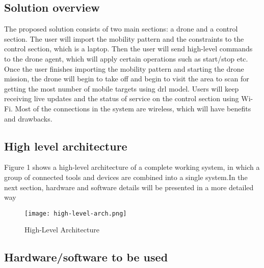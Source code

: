\documentclass[../main.tex]{subfiles}
\begin{document}
\subsection{Solution overview}

The proposed solution consists of two main sections: a drone and a control section. The user will import
the mobility pattern and the constraints to the control section, which is a laptop. Then the user will send high-level commands to the drone agent, which will apply certain operations such as start/stop etc. Once the user finishes importing the mobility pattern and starting the drone mission, the drone will begin to take off and begin to visit the area to scan for getting the most number of mobile targets using \gls{drl} model. Users will keep receiving live updates and the status of service on the control section using Wi-Fi. Most of the connections in the system are wireless, which will have benefits and drawbacks.


\subsection{High level architecture}
Figure 1 shows a high-level architecture of a complete working system, in which a group of connected tools and devices are combined into a single system.In the next section, hardware and software details will be presented in a more detailed way
\begin{figure}[H]
	\centering
	\texttt{[image: high-level-arch.png]}
	\caption{High-Level Architecture}\label{fig1:arch-fig}
\end{figure}


\subsection{Hardware/software to be used}
\end{document}
